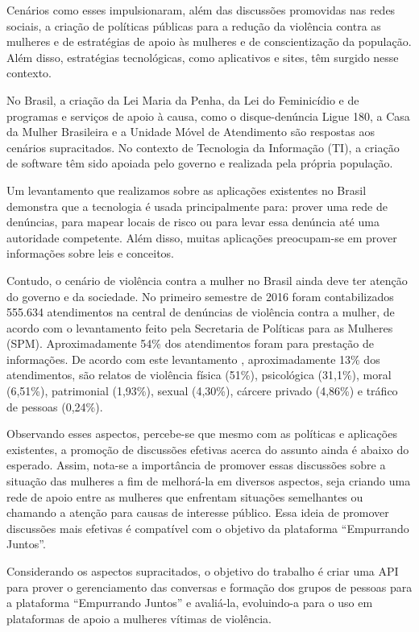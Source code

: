 Cenários como esses impulsionaram, além das discussões promovidas nas redes sociais, a criação de políticas públicas para a redução da violência 
contra as mulheres e de estratégias de apoio às mulheres e de conscientização da população. Além disso, estratégias tecnológicas, 
como aplicativos e sites, têm surgido nesse contexto.

No Brasil, a criação da Lei Maria da Penha, da Lei do Feminicídio e de programas e serviços de apoio à causa, 
como o disque-denúncia Ligue 180, a Casa da Mulher Brasileira e a Unidade Móvel de Atendimento são respostas aos cenários supracitados. 
No contexto de Tecnologia da Informação (TI), a criação de software têm sido apoiada pelo governo e realizada pela própria população.

Um levantamento que realizamos sobre as aplicações existentes no Brasil demonstra que a tecnologia é usada principalmente para: 
prover uma rede de denúncias, para mapear locais de risco ou para levar essa denúncia até uma autoridade competente. Além disso, muitas aplicações 
preocupam-se em prover informações sobre leis e conceitos.

Contudo, o cenário de violência contra a mulher no Brasil ainda deve ter atenção do governo e da sociedade. No primeiro semestre de 2016 
foram contabilizados 555.634 atendimentos na central de denúncias 
de violência contra a mulher, de acordo com o levantamento feito pela Secretaria de Políticas para as Mulheres (SPM). 
Aproximadamente 54\% dos atendimentos foram para prestação de informações. De acordo com este levantamento \cite{portal_180}, aproximadamente 13\% dos 
atendimentos, 
são relatos de violência física (51\%), psicológica (31,1\%), moral (6,51\%), patrimonial (1,93\%), sexual (4,30\%), cárcere privado (4,86\%) e 
tráfico de pessoas (0,24\%).

Observando esses aspectos, percebe-se que mesmo com as políticas e aplicações existentes, a promoção de discussões efetivas acerca do 
assunto ainda é abaixo do esperado. Assim, nota-se a importância de promover essas discussões sobre a situação das mulheres a fim de 
melhorá-la em diversos aspectos, seja criando uma rede de apoio entre as mulheres que enfrentam situações semelhantes ou chamando a atenção 
para causas de interesse público. Essa ideia de promover discussões mais efetivas é compatível com o objetivo da plataforma ``Empurrando Juntos''.

Considerando os aspectos supracitados, o objetivo do trabalho é criar uma API para prover o gerenciamento das conversas e formação
dos grupos de pessoas para a plataforma ``Empurrando Juntos'' e avaliá-la, evoluindo-a para o uso em plataformas de apoio a mulheres 
vítimas de violência.


